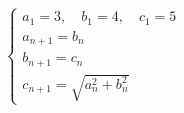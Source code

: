 \[
\begin{cases}
a_1 = 3,\quad b_1 = 4,\quad c_1 = 5 \\
a_{n+1} = b_n \\
b_{n+1} = c_n \\
c_{n+1} = \sqrt{a_n^2 + b_n^2}
\end{cases}
\]
